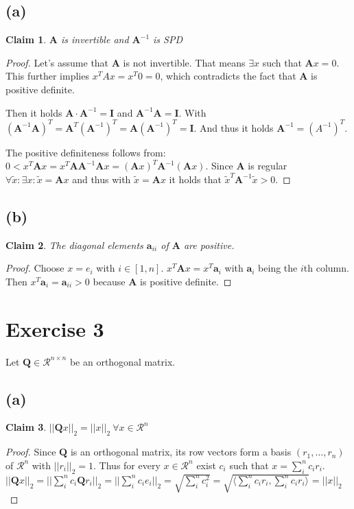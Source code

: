 \documentclass{article}
\newcommand{\norm}[1]{||#1||}
\newtheorem{claim}{Claim}
\begin{document}
	\subsection*{(a)}
		\begin{claim}
			$\pmb A$ is invertible and $\pmb A^{-1}$ is SPD
		\end{claim}
		\begin{proof}
			Let's assume that $\pmb A$ is not invertible. That means $\exists x$ such that $\pmb A x=0$. This further implies $x^{T}Ax = x^{T}0 = 0$, which contradicts the fact that $\pmb A$ is positive definite.
			
			Then it holds $\pmb A\cdot \pmb A^{-1} = \pmb I$ and $\pmb A^{-1}\pmb A =\pmb I$. With $(\pmb A^{-1}\pmb A)^{T} = \pmb A^{T} (\pmb A^{-1})^{T} = \pmb A (\pmb A^{-1})^{T} = \pmb I$. And thus it holds $\pmb A^{-1}=(A^{-1})^{T}$.
			
			The positive definiteness follows from: $0 < x^{T}\pmb Ax = x^{T}\pmb A\pmb A^{-1}\pmb Ax = (\pmb Ax)^{T}\pmb A^{-1}(\pmb Ax)$. Since $\pmb A$ is regular $\forall \tilde{x}: \exists x: \tilde{x} = \pmb A x$ and thus with $\tilde{x} = \pmb A x$ it holds that $\tilde{x}^{T} \pmb A^{-1} \tilde{x} >0$.
		\end{proof}
	\subsection*{(b)}
		\begin{claim}
			The diagonal elements $\pmb a_{ii}$ of $\pmb A$ are positive.
		\end{claim}
		
		\begin{proof}
			Choose $x=e_{i}$ with $i \in [1,n]$. $x^{T}\pmb A x = x^{T}\pmb a_{i}$ with $\pmb a_{i}$ being the $i$th column. Then $x^{T}\pmb a_{i}=\pmb a_{ii} > 0$ because $\pmb A$ is positive definite.
		\end{proof}
		
\section*{Exercise 3}
	Let $\pmb Q\in \mathcal{R}^{n\times n}$ be an orthogonal matrix.
	\subsection*{(a)}
		\begin{claim}
			$\norm{\pmb Qx}_{2} = \norm{x}_{2}\  \forall x \in \mathcal{R}^{n}$
		\end{claim}
		\begin{proof}
			Since $\pmb Q$ is an orthogonal matrix, its row vectors form a basis $(r_{1},\ldots,r_{n})$ of $\mathcal R^{n}$ with $\norm{r_{i}}_{2}=1$. Thus for every $x\in \mathcal{R}^{n}$ exist $c_{i}$ such that $x=\sum_{i}^{n}c_{i}r_{i}$. $\norm{\pmb Q x}_{2}=\norm{\sum_{i}^{n} c_{i} \pmb Q r_{i}}_{2}= \norm{\sum_{i}^{n} c_{i}e_{i}}_{2} = \sqrt{\sum_{i}^{n}c_{i}^{2}} = \sqrt{\langle \sum_{i}^{n} c_{i}r_{i},\sum_{i}^{n}c_{i}r_{i}\rangle} = \norm{x}_{2}$
		\end{proof}
\end{document}

